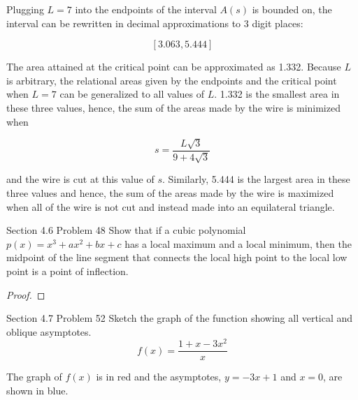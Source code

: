 \documentclass{article}
\begin{document}
    Plugging $L=7$ into the endpoints of the interval $A(s)$ is bounded on, the interval can be rewritten in decimal approximations to 3 digit places:

    \[
        [3.063, 5.444]
    \]

    The area attained at the critical point can be approximated as 1.332. Because $L$ is arbitrary, the relational areas given by the endpoints and the critical point when $L=7$ can be generalized to all values of $L$.
    1.332 is the smallest area in these three values, hence, the sum of the areas made by the wire is minimized when

    \[
        s = \frac{L\sqrt{3}}{9+4\sqrt{3}}
    \]

    and the wire is cut at this value of $s$. Similarly, 5.444 is the largest area in these three values and hence, the sum of the areas made by the wire is maximized when all of the wire is not cut and instead made into
    an equilateral triangle.


    \begin{tbhtheorem}{Section 4.6 Problem 48}
        Show that if a cubic polynomial $p(x)=x^3 + ax^2 + bx + c$ has a local maximum and a local minimum, then the midpoint of the line segment that connects the local high point to the local low point is a point of
        inflection.
    \end{tbhtheorem}

    \begin{proof}

    \end{proof}

    \begin{tbhtheorem}{Section 4.7 Problem 52}
        Sketch the graph of the function showing all vertical and oblique asymptotes.
        \[
            f(x) = \frac{1+x-3x^2}{x}
        \]
    \end{tbhtheorem}

    The graph of $f(x)$ is in red and the asymptotes, $y=-3x+1$ and $x=0$, are shown in blue.
\end{document}

